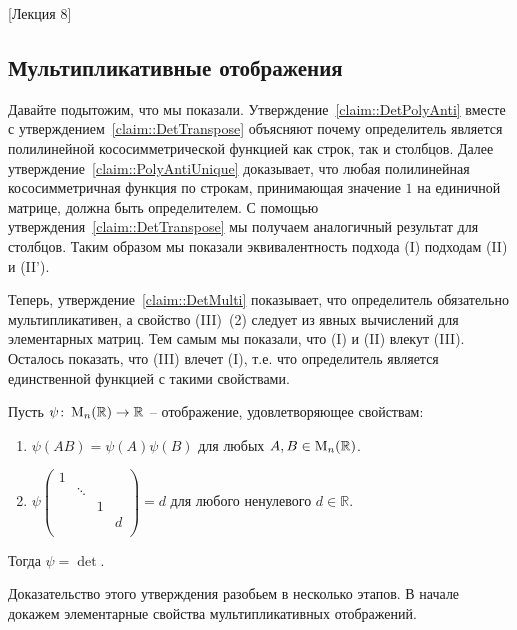 [Лекция 8]


\subsection{Мультипликативные отображения}

Давайте подытожим, что мы показали.
Утверждение~\ref{claim::DetPolyAnti} вместе с утверждением~\ref{claim::DetTranspose} объясняют почему определитель является полилинейной кососимметрической функцией как строк, так и столбцов.
Далее утверждение~\ref{claim::PolyAntiUnique} доказывает, что любая полилинейная кососимметричная функция по строкам, принимающая значение $1$ на единичной матрице, должна быть определителем.
С помощью утверждения~\ref{claim::DetTranspose} мы получаем аналогичный результат для столбцов.
Таким образом мы показали эквивалентность подхода (I) подходам (II) и (II').

Теперь, утверждение~\ref{claim::DetMulti} показывает, что определитель обязательно мультипликативен, а свойство (III)~(2) следует из явных вычислений для элементарных матриц.
Тем самым мы показали, что (I) и (II) влекут (III).
Осталось показать, что (III) влечет (I), т.е. что определитель является единственной функцией с такими свойствами.

\begin{claim}
\label{claim::DetMultiUnique}
Пусть $\psi\colon \operatorname{M}_{n}(\mathbb R)\to \mathbb R$ -- отображение, удовлетворяющее свойствам:
\begin{enumerate}
\item $\psi(AB) = \psi(A)\psi(B)$ для любых $A,B\in\operatorname{M}_{n}(\mathbb R)$.

\item 
$
\psi
\begin{pmatrix}
{1}&{}&{}&{}\\
{}&{\ddots}&{}&{}\\
{}&{}&{1}&{}\\
{}&{}&{}&{d}\\
\end{pmatrix}
= 
d
$ для любого ненулевого $d\in\mathbb R$.
\end{enumerate}
Тогда $\psi = \det$.
\end{claim}

Доказательство этого утверждения разобьем в несколько этапов.
В начале докажем элементарные свойства мультипликативных отображений.

